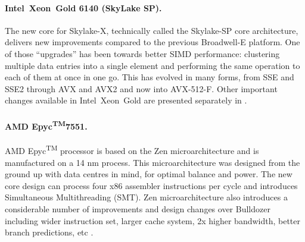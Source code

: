 \paragraph{Intel\textregistered\ Xeon\textregistered\ Gold 6140 (SkyLake SP).}
The new core for Skylake-X, technically called the Skylake-SP core architecture, delivers new improvements compared to the previous Broadwell-E platform. One of those ``upgrades'' has been towards better SIMD performance: clustering multiple data entries into a single element and performing the same operation to each of them at once in one go. This has evolved in many forms, from SSE and SSE2 through AVX and AVX2 and now into AVX-512-F.
Other important changes available in Intel\textregistered\ Xeon\textregistered\ Gold are presented separately in \cite{INTELXEONGOLD6140}.

\paragraph{AMD Epyc\texorpdfstring{\textsuperscript{TM}}\ 7551.}
AMD Epyc\textsuperscript{TM} processor is based on the Zen microarchitecture and is manufactured on a 14 nm process. This microarchitecture was designed from the ground up with data centres in mind, for optimal balance and power. The new core design can process four x86 assembler instructions per cycle and introduces Simultaneous Multithreading (SMT).
Zen microarchitecture also introduces a considerable number of improvements and design changes over Bulldozer
including wider instruction set, larger cache system, 2x higher bandwidth, better branch predictions, etc
\cite{2019:epyc, now:epyc}.


